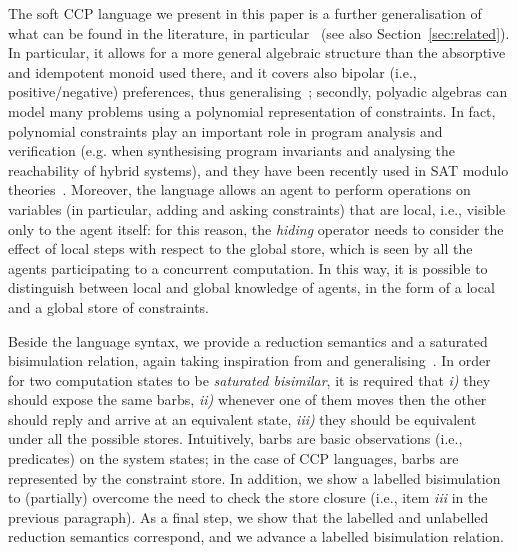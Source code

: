 \documentclass{llncs}
\begin{document}
The soft CCP language we present in this paper is a further generalisation of what can be found in the literature, in particular~\cite{pippo} (see also Section~\ref{sec:related}). In particular, it allows for a more general algebraic structure than the absorptive and idempotent monoid used there, and it covers 
also bipolar (i.e., positive/negative) preferences, thus generalising~\cite{posneg}; secondly, polyadic algebras can %
model many problems using a polynomial representation of constraints. In fact, polynomial constraints  play an important role in program analysis and verification (e.g. when synthesising program invariants and analysing the reachability of hybrid systems), and they have been recently used in SAT modulo theories~\cite{smtpolynomial}.
Moreover, the language allows an agent to perform operations  on variables (in particular, adding and asking constraints) that are local, i.e., visible only to the agent itself: for this reason, the \emph{hiding} operator needs to consider the effect of local steps with respect to the global store, which is seen by all the agents participating to a concurrent computation. In this way, it is possible to distinguish between local and global knowledge of agents, in the form of a local and a global store of constraints.

Beside the language syntax, we provide a reduction semantics and a saturated bisimulation relation, again taking inspiration from and generalising~\cite{pippo}. In order for two computation states to be \emph{saturated bisimilar}, it is required that \emph{i)} they should expose the same barbs, \emph{ii)} whenever one of them moves then the other should reply and arrive at an equivalent state, \emph{iii)} they should be equivalent under all the possible stores.
Intuitively, barbs are basic observations (i.e., predicates) on the system states; in the case of CCP languages, barbs are represented by the constraint store. In addition, we show a labelled bisimulation to (partially) overcome the need to check the store closure (i.e., item \emph{iii} in the previous paragraph). As a final step, we show that the labelled and unlabelled reduction semantics correspond, and we advance a labelled bisimulation relation.
\end{document}
